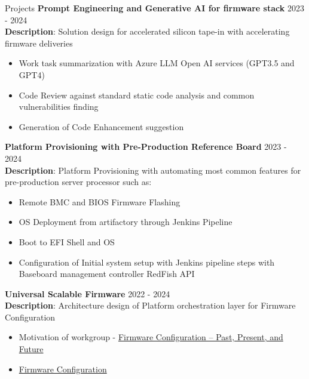 \documentclass{resume} %
\begin{document}
\begin{rSection}{Projects}
{\bf Prompt Engineering and Generative AI for firmware stack} \hfill {2023 - 2024}\\
\textbf{Description}: Solution design for accelerated silicon tape-in with accelerating firmware deliveries

\begin{itemize}
    \item Work task summarization with Azure LLM Open AI services (GPT3.5 and GPT4)
    \item Code Review against standard static code analysis and common vulnerabilities finding
    \item Generation of Code Enhancement suggestion 
\end{itemize}

\textbf{Platform Provisioning with Pre-Production Reference Board} \hfill {2023 - 2024}\\
\textbf{Description}: Platform Provisioning with automating most common features for pre-production server processor such as:

\begin{itemize}
    \item Remote BMC and BIOS Firmware Flashing
    \item OS Deployment from artifactory through Jenkins Pipeline
    \item Boot to EFI Shell and OS
    \item Configuration of Initial system setup with Jenkins pipeline steps with Baseboard management controller RedFish API
\end{itemize}

\textbf{Universal Scalable Firmware} \hfill {2022 - 2024} \\
\textbf{Description}: Architecture design of Platform orchestration layer for Firmware Configuration

\begin{itemize}
    \item Motivation of workgroup - \href{https://uefi.org/sites/default/files/resources/Firmware%20Configuration%20%E2%80%93%20Past%2C%20Present%2C%20and%20Future_Zimmer.pdf}{Firmware Configuration – Past, Present, and Future}
    \item \href{https://universalscalablefirmware.github.io/documentation/7_yaml_boot_configuration.html}{Firmware Configuration}
\end{itemize}


\end{rSection}
\end{document}
